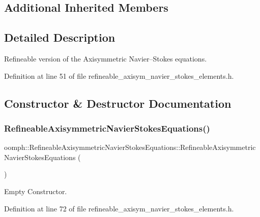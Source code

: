 \subsection*{Additional Inherited Members}


\subsection{Detailed Description}
Refineable version of the Axisymmetric Navier--Stokes equations. 

Definition at line 51 of file refineable\+\_\+axisym\+\_\+navier\+\_\+stokes\+\_\+elements.\+h.



\subsection{Constructor \& Destructor Documentation}
\mbox{\label{classoomph_1_1RefineableAxisymmetricNavierStokesEquations_a65ab079fd600413cfa0a72c0107b4ac3}} 
\subsubsection{\texorpdfstring{Refineable\+Axisymmetric\+Navier\+Stokes\+Equations()}{RefineableAxisymmetricNavierStokesEquations()}}
{\footnotesize\ttfamily oomph\+::\+Refineable\+Axisymmetric\+Navier\+Stokes\+Equations\+::\+Refineable\+Axisymmetric\+Navier\+Stokes\+Equations (\begin{DoxyParamCaption}{ }\end{DoxyParamCaption})\hspace{0.3cm}{\ttfamily [inline]}}



Empty Constructor. 



Definition at line 72 of file refineable\+\_\+axisym\+\_\+navier\+\_\+stokes\+\_\+elements.\+h.




